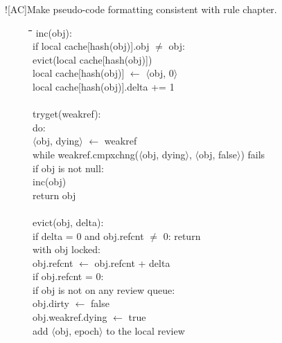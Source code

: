 \XXX![AC]{Make pseudo-code formatting consistent with rule chapter.}

\begin{figure}
  \def\fgap{-0.25em}            %
  \begin{tabbing}
    \quad\=\quad\=\quad\=\quad\=\quad\=\quad\=\kill
    inc(obj): \+\\
      if local cache[hash(obj)].obj $\ne$ obj: \+\\
        evict(local cache[hash(obj)]) \\
        local cache[hash(obj)] $\gets$ $\langle$obj, 0$\rangle$ \-\\
      local cache[hash(obj)].delta += 1 \\
    \-\\[\fgap]
    tryget(weakref): \+\\
      do: \+\\
        $\langle$obj, dying$\rangle$ $\gets$ weakref \-\\
      while weakref.cmpxchng($\langle$obj, dying$\rangle$,
        $\langle$obj, false$\rangle$) fails \\
      if obj is not null: \+\\
        inc(obj) \-\\
      return obj \\
    \-\\[\fgap]
    evict(obj, delta): \+\\
      if delta = 0 and obj.refcnt $\ne$ 0: return \\
      with obj locked: \+\\
        obj.refcnt $\gets$ obj.refcnt + delta \\
        if obj.refcnt = 0: \+\\
          if obj is not on any review queue: \+\\
            obj.dirty $\gets$ false \\
            obj.weakref.dying $\gets$ true \\
            add $\langle$obj, epoch$\rangle$ to the local review

\end{tabbing}
\end{figure}
